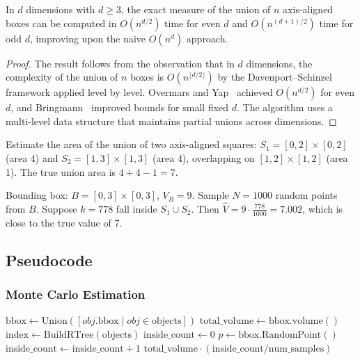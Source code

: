 \begin{theorem}\label{thm:klee_bounds}
In $d$ dimensions with $d \geq 3$, the exact measure of the union of $n$ axis-aligned boxes can be computed in $O(n^{d/2})$ time for even $d$ and $O(n^{(d+1)/2})$ time for odd $d$, improving upon the naive $O(n^d)$ approach.
\end{theorem}

\begin{proof}
The result follows from the observation that in $d$ dimensions, the complexity of the union of $n$ boxes is $O(n^{\lfloor d/2 \rfloor})$ by the Davenport--Schinzel framework applied level by level. Overmars and Yap~\cite{overmars1991} achieved $O(n^{d/2})$ for even $d$, and Bringmann~\cite{bringmann2012} improved bounds for small fixed $d$. The algorithm uses a multi-level data structure that maintains partial unions across dimensions.
\end{proof}

\begin{example}\label{ex:monte_carlo}
Estimate the area of the union of two axis-aligned squares: $S_1 = [0,2] \times [0,2]$ (area 4) and $S_2 = [1,3] \times [1,3]$ (area 4), overlapping on $[1,2] \times [1,2]$ (area 1). The true union area is $4 + 4 - 1 = 7$.

Bounding box: $B = [0,3] \times [0,3]$, $V_B = 9$. Sample $N = 1000$ random points from $B$. Suppose $k = 778$ fall inside $S_1 \cup S_2$. Then $\hat{V} = 9 \cdot \frac{778}{1000} = 7.002$, which is close to the true value of 7.
\end{example}

\subsection{Pseudocode}

\subsubsection*{Monte Carlo Estimation}
\begin{algorithm}[ht]
\label{alg:monte_carlo_volume}
\begin{algorithmic}[1]
    \State $\text{bbox} \gets \text{Union}([obj.\text{bbox} \mid obj \in \text{objects}])$
    \State $\text{total\_volume} \gets \text{bbox.volume}()$
    \State $\text{index} \gets \text{BuildRTree}(\text{objects})$
    \State $\text{inside\_count} \gets 0$
        \State $p \gets \text{bbox.RandomPoint}()$
            \State $\text{inside\_count} \gets \text{inside\_count} + 1$
        \EndIf
    \EndFor
    \State \Return $\text{total\_volume} \cdot (\text{inside\_count} / \text{num\_samples})$
\EndFunction
\end{algorithmic}
\end{algorithm}

